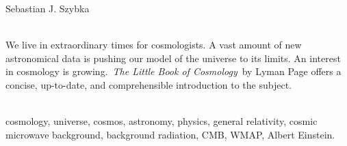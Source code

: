 \begin{newrevplenv}{Sebastian J. Szybka}
\nocite{page_mala_2021}



\vspace{5mm}%
\begin{flushright}
{\chaptitleeng\color{black!50}{The little book about the large universe}}
\end{flushright}

{}\\
{We live in extraordinary times for cosmologists. A vast amount of new astronomical data is pushing our model of the universe to its limits. An interest in cosmology is growing. \textit{The Little Book of Cosmology} by Lyman Page offers a concise, up-to-date, and comprehensible introduction to the subject.
}\par%
\vspace{2mm}%
{}\\%
{
cosmology, universe, cosmos, astronomy, physics, general relativity, cosmic microwave background, background radiation, CMB, WMAP, Albert Einstein.
}%


\end{newrevplenv}
